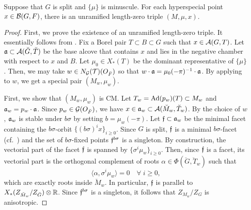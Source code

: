 \documentclass[12pt,reqno]{amsart}
\begin{document}
\begin{prop} \label{prop:existence_triple}
    Suppose that $G$ is split and $\{\mu\}$ is minuscule. For each hyperspecial point $x \in {\mathcal{B}}(G, F)$, there is an unramified length-zero triple $(M, \mu, x)$. 
\end{prop}
\begin{proof}
    First, we prove the existence of an unramified length-zero triple. It essentially follows from \cite[Remark 2.1, Section 5.1]{Tak25z}. Fix a Borel pair $T \subset B \subset G$ such that $x \in {\mathcal{A}}(G, T)$. Let ${\mathfrak{a}} \subset {\mathcal{A}}(\breve{G}, \breve{T})$ be the base alcove that contains $x$ and lies in the negative chamber with respect to $x$ and $B$. Let $\mu_0 \in X_*(T)$ be the dominant representative of $\{\mu\}$. Then, we may take $w \in N_{{\mathcal{G}}}({\mathcal{T}})(O_{\breve{F}})$ so that $w \cdot {\mathfrak{a}} = \mu_0(-\pi)^{-1} \cdot {\mathfrak{a}}$. By applying  to $w$, we get a special pair $(M_w, \mu_w)$. %
    
    First, we show that $(M_w, \mu_w)$ is CM. Let $T_w = {\operatorname{Ad}}(p_w)(T) \subset M_w$ and ${\mathfrak{a}}_w = p_w \cdot {\mathfrak{a}}$. Since $p_w \in {\mathcal{G}}(O_{\breve{F}})$, we have $x \in {\mathfrak{a}}_w \subset {\mathcal{A}}(\breve{M}_w, \breve{T}_w)$. By the choice of $w$, ${\mathfrak{a}}_w$ is stable under $b\sigma$ by setting $b = \mu_w(-\pi)$. Let ${\mathfrak{f}} \subset {\mathfrak{a}}_w$ be the minimal facet containing the $b\sigma$-orbit $\{ (b\sigma)^i x\}_{i \geq 0}$. Since $G$ is split, ${\mathfrak{f}}$ is a minimal $b\sigma$-facet (cf.\ \cite[Corollary 5.3]{Tak25z}) and the set of $b\sigma$-fixed points ${\mathfrak{f}}^{b\sigma}$ is a singleton. By construction, the vectorial part of the facet ${\mathfrak{f}}$ is spanned by $\{\sigma^i \mu_w\}_{i \geq 0}$. Then, since ${\mathfrak{f}}$ is a facet, its vectorial part is the orthogonal complement of roots $\alpha \in \Phi(\breve{G}, \breve{T}_w)$ such that 
    \[
        \langle \alpha, \sigma^i \mu_w \rangle = 0\quad \forall \; i \geq 0, 
    \]
    which are exactly roots inside $\breve{M}_w$. In particular, ${\mathfrak{f}}$ is parallel to $X_*(Z_{\breve{M}_w} / Z_{\breve{G}}) \otimes \mathbb{R}$. Since ${\mathfrak{f}}^{b\sigma}$ is a singleton, it follows that $Z_{M_w} / Z_G$ is anisotropic. 


\end{proof}
\end{document}
